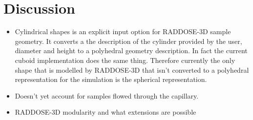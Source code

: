 \section{Discussion}
\label{sec:Discussion}
\begin{itemize}
    \item Cylindrical shapes is an explicit input option for RADDOSE-3D sample geometry. It converts a the description of the cylinder provided by the user, diameter and height to a polyhedral geometry description. In fact the current cuboid implementation does the same thing. Therefore currently the only shape that is modelled by RADDOSE-3D that isn't converted to a polyhedral representation for the simulation is the spherical representation.
    \item Doesn't yet account for samples flowed through the capillary.
    \item RADDOSE-3D modularity and what extensions are possible
\end{itemize}

